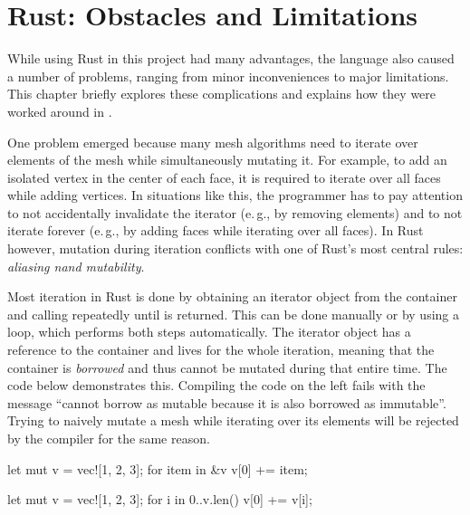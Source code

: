 \chapter{Rust: Obstacles and Limitations}

While using Rust in this project had many advantages, the language also caused a number of problems, ranging from minor inconveniences to major limitations.
This chapter briefly explores these complications and explains how they were worked around in .

\vfill

One problem emerged because many mesh algorithms need to iterate over elements of the mesh while simultaneously mutating it.
For example, to add an isolated vertex in the center of each face, it is required to iterate over all faces while adding vertices.
In situations like this, the programmer has to pay attention to not accidentally invalidate the iterator (e.\,g., by removing elements) and to not iterate forever (e.\,g., by adding faces while iterating over all faces).
In Rust however, mutation during iteration conflicts with one of Rust's most central rules: \emph{aliasing nand mutability}.

Most iteration in Rust is done by obtaining an iterator object from the container and calling  repeatedly until  is returned.
This can be done manually or by using a  loop, which performs both steps automatically.
The iterator object has a reference to the container and lives for the whole iteration, meaning that the container is \emph{borrowed} and thus cannot be mutated during that entire time.
The code below demonstrates this.
Compiling the code on the left fails with the message \enquote{cannot borrow  as mutable because it is also borrowed as immutable}.
Trying to naively mutate a mesh while iterating over its elements will be rejected by the compiler for the same reason.

\vspace{5mm}
\begin{minipage}{0.49\textwidth}
  \begin{rustcode}
    let mut v = vec![1, 2, 3];
    for item in &v {
        v[0] += item;
    }
  \end{rustcode}
\end{minipage}
\begin{minipage}{0.49\textwidth}
  \begin{rustcode}
    let mut v = vec![1, 2, 3];
    for i in 0..v.len() {
        v[0] += v[i];
    }
  \end{rustcode}
\end{minipage}
\vspace{5mm}

